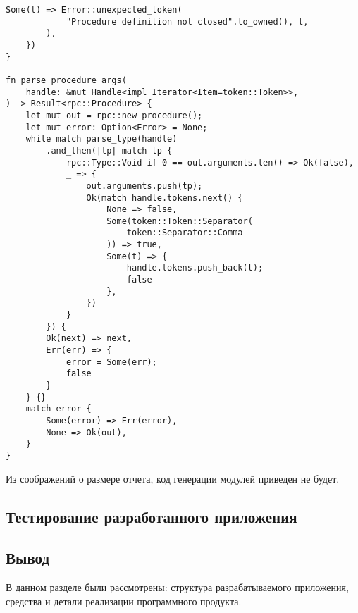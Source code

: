 \begin{lstlisting}[caption={Разбор процедуры (часть 2)}, label={lst:rust_parser_procedure2}]
        Some(t) => Error::unexpected_token(
            "Procedure definition not closed".to_owned(), t,
        ),
    })
}

fn parse_procedure_args(
    handle: &mut Handle<impl Iterator<Item=token::Token>>,
) -> Result<rpc::Procedure> {
    let mut out = rpc::new_procedure();
    let mut error: Option<Error> = None;
    while match parse_type(handle)
        .and_then(|tp| match tp {
            rpc::Type::Void if 0 == out.arguments.len() => Ok(false),
            _ => {
                out.arguments.push(tp);
                Ok(match handle.tokens.next() {
                    None => false,
                    Some(token::Token::Separator(
                        token::Separator::Comma
                    )) => true,
                    Some(t) => {
                        handle.tokens.push_back(t);
                        false
                    },
                })
            }
        }) {
        Ok(next) => next,
        Err(err) => {
            error = Some(err);
            false
        }
    } {}
    match error {
        Some(error) => Err(error),
        None => Ok(out),
    }
}
\end{lstlisting}

Из соображений о размере отчета, код генерации модулей приведен не будет.

\subsection{Тестирование разработанного приложения}

\subsection*{Вывод}

В данном разделе были рассмотрены: структура разрабатываемого приложения,
средства и детали реализации программного продукта.

